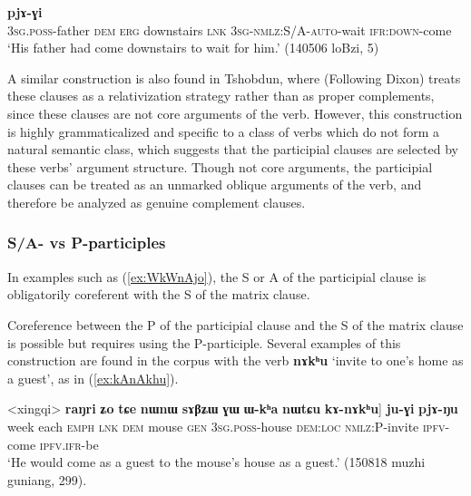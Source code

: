 \documentclass[oneside,a4paper,11pt]{article}
\newcommand{\ipa}[1]{\textbf{\phon#1}} %
\newcommand{\jpg}[2]{\ipa{#1} `#2'} %
\begin{document}
\begin{exe}
\ex \label{ex:WkWnAjo}
\gll [\ipa{ɯ-wa} 	\ipa{nɯ} 	\ipa{kɯ} 	\ipa{kʰapa} 	\ipa{tɕe} 	\ipa{ɯ-kɯ-n-nɤjo}] 	\ipa{pjɤ-ɣi} \\
\textsc{3sg.poss}-father \textsc{dem} \textsc{erg} downstairs \textsc{lnk} \textsc{3sg-nmlz:S/A-auto}-wait \textsc{ifr:down}-come \\
\glt `His father had come downstairs to wait for him.' (140506 loBzi, 5)
\end{exe}


A similar construction is also found in Tshobdun, where \citet{sun12complementation} (Following Dixon) treats these clauses as a relativization strategy rather than as proper complements, since these clauses are not core arguments of the verb. However, this construction is highly grammaticalized and specific to a class of verbs which do not form a natural semantic class, which suggests that the participial clauses are selected by these verbs' argument structure. Though not core arguments, the participial clauses can be treated as an unmarked oblique arguments of the verb, and therefore be analyzed as genuine complement clauses.

\subsubsection{S/A- vs P-participles} \label{sec:SAparticiple.coref}
In examples such as (\ref{ex:WkWnAjo}), the S or A of the participial clause is obligatorily coreferent with the S of the matrix clause.

Coreference between the P of the participial clause and the S of the matrix clause is possible but requires using the P-participle. Several examples of this construction are found in the corpus with the verb \jpg{nɤkʰu}{invite to one's home as a guest}, as in (\ref{ex:kAnAkhu}).

\begin{exe}
\ex \label{ex:kAnAkhu}
\gll <xingqi> 	\ipa{raŋri} 	\ipa{ʑo} 	\ipa{tɕe} 	\ipa{nɯnɯ} \ipa{sɤβʑɯ} 	\ipa{ɣɯ} 	\ipa{ɯ-kʰa} 	\ipa{nɯtɕu} 	\ipa{kɤ-nɤkʰu}] 	\ipa{ju-ɣi} 	\ipa{pjɤ-ŋu} \\
week each \textsc{emph} \textsc{lnk} \textsc{dem} mouse \textsc{gen} \textsc{3sg.poss}-house \textsc{dem:loc} \textsc{nmlz:P}-invite \textsc{ipfv}-come \textsc{ipfv.ifr}-be \\
\glt `He would come as a guest to the mouse's house as a guest.' (150818 muzhi guniang, 299).
\end{exe}
\end{document}
